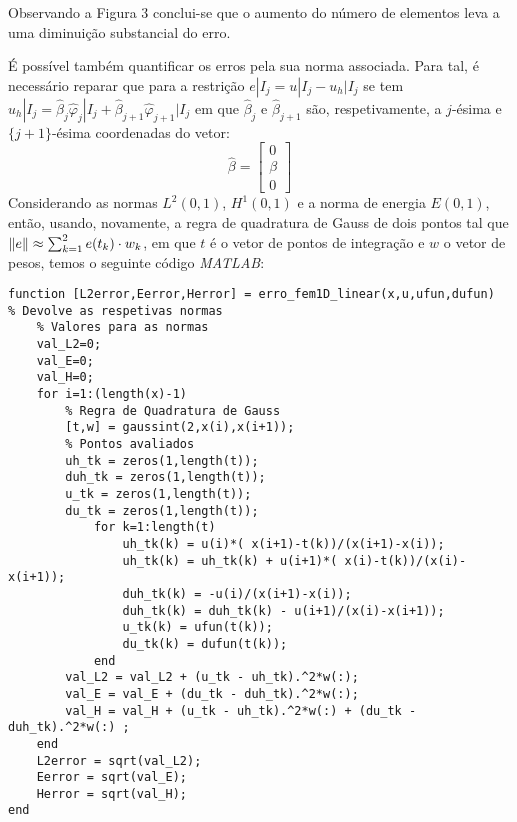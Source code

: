 \documentclass{article}
\theoremstyle{definition}
\theoremstyle{plain}
\numberwithin{equation}{section}
\newcommand{\tab}{\hspace{10mm}}
\begin{document}
Observando a Figura 3 conclui-se que o aumento do número de elementos leva a uma diminuição substancial do erro.

\vspace{5mm}

\tab É possível também quantificar os erros pela sua norma associada. Para tal, é necessário reparar que para a restrição $e|I_j = u|I_j - u_h|I_j$ se tem $u_h|I_j = \hat{\beta}_j\hat{\varphi}_j|I_j + \hat{\beta}_{j+1}\hat{\varphi}_{j+1}|I_j$ em que $\hat{\beta}_j$ e $\hat{\beta}_{j+1}$ são, respetivamente, a $j$-ésima e $\{j+1\}$-ésima coordenadas do vetor:
\begin{equation*}
    \hat{\beta}=\begin{bmatrix} 0 \\ \beta \\ 0\end{bmatrix}
\end{equation*}
 Considerando  as normas $L^2(0,1)$, $H^1(0,1)$ e a norma de energia $E(0,1)$, então, usando, novamente, a regra de quadratura de Gauss de dois pontos tal que $\norm{e}\approx \sum^2_{k=1} e(t_k)\cdot w_k$, em que $t$ é o vetor de pontos de integração e $w$ o vetor de pesos, temos o seguinte código \emph{MATLAB}:

\vspace{5mm}

\begin{lstlisting}[frame=single]
function [L2error,Eerror,Herror] = erro_fem1D_linear(x,u,ufun,dufun)
% Devolve as respetivas normas
    % Valores para as normas
    val_L2=0;
    val_E=0;
    val_H=0;
    for i=1:(length(x)-1)
        % Regra de Quadratura de Gauss
        [t,w] = gaussint(2,x(i),x(i+1));
        % Pontos avaliados
        uh_tk = zeros(1,length(t));
        duh_tk = zeros(1,length(t));
        u_tk = zeros(1,length(t));
        du_tk = zeros(1,length(t));
            for k=1:length(t)
                uh_tk(k) = u(i)*( x(i+1)-t(k))/(x(i+1)-x(i));
                uh_tk(k) = uh_tk(k) + u(i+1)*( x(i)-t(k))/(x(i)-x(i+1));
                duh_tk(k) = -u(i)/(x(i+1)-x(i));
                duh_tk(k) = duh_tk(k) - u(i+1)/(x(i)-x(i+1));
                u_tk(k) = ufun(t(k));
                du_tk(k) = dufun(t(k));
            end
        val_L2 = val_L2 + (u_tk - uh_tk).^2*w(:);
        val_E = val_E + (du_tk - duh_tk).^2*w(:);
        val_H = val_H + (u_tk - uh_tk).^2*w(:) + (du_tk - duh_tk).^2*w(:) ;
    end
    L2error = sqrt(val_L2);
    Eerror = sqrt(val_E);
    Herror = sqrt(val_H);
end
\end{lstlisting}
\vspace{5mm}
\end{document}
